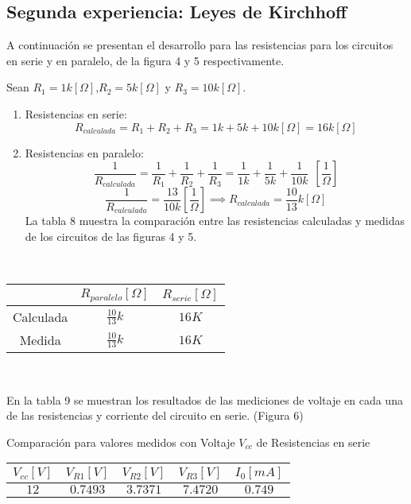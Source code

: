 \documentclass[letterpaper,11pt]{article} %
\begin{document}
\subsection{Segunda experiencia: Leyes de Kirchhoff}
A continuación se presentan el desarrollo para las resistencias para los circuitos en serie y en paralelo, de la figura 4 y 5 respectivamente.

Sean $R_1=1k[\Omega]$,$R_2=5k[\Omega]$ y $R_3=10k[\Omega]$.
\begin{enumerate}
    \item Resistencias en serie:
    $$ R_{calculada}=R_1+R_2+R_3=1k+5k+10k [\Omega]=16k [\Omega]$$
    \item Resistencias en paralelo:
    $$\frac{1}{R_{calculada}}=\frac{1}{R_1}+\frac{1}{R_2}+\frac{1}{R_3}=\frac{1}{1k}+\frac{1}{5k}+\frac{1}{10k} ~~\left [ \frac{1}{\Omega}   \right ]$$
    $$ \frac{1}{R_{calculada}}=\frac{13}{10k}\left [ \frac{1}{\Omega}   \right ]\implies R_{calculada}=\frac{10}{13}k [\Omega]$$
La tabla 8 muestra la comparación entre las resistencias calculadas y medidas de los circuitos de las figuras 4 y 5.
\end{enumerate}{}
\begin{center} \vspace*{1mm} \\
\begin{tabular}{|c|c|c|}
\hline
            & $R_{paralelo} [\Omega]$ & $R_{serie} [\Omega]$ \\ \hline
Calculada   &     $\frac{10}{13} k$     &   $16K$            \\ \hline
Medida      &     $\frac{10}{13} k$     &   $16K$            \\ \hline
\end{tabular}\\
\end{center}
En la tabla 9 se muestran los resultados de las mediciones de voltaje en cada una de las resistencias y corriente del circuito en serie. (Figura 6) 
\begin{center}
    Comparación para valores medidos con Voltaje $V_{cc}$ de Resistencias en serie
    \begin{tabular}{|c|c|c|c|c|}
    \hline
         $V_{cc} [V]$ & $V_{R1} [V]$ & $V_{R2} [V]$ & $V_{R3} [V]$ & $I_{0} [mA]$  \\ \hline
            $12$  & $0.7493$ & $3.7371$ &  $7.4720$ & $0.749$ \\ \hline 
    \end{tabular}
\end{center}
\end{document}
